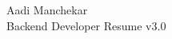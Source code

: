 \documentclass{article}
\begin{document}
\begin{center}
    \Huge Aadi Manchekar \\
    \Large Backend Developer Resume v3.0
\end{center}
\end{document}
